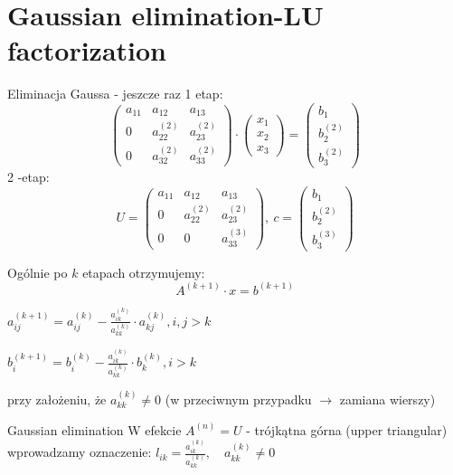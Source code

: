 \section{Gaussian elimination-LU factorization}

\begin{frame}{Eliminacja Gaussa - jeszcze raz}
1 etap:
$$
\left(\begin{array}{lll}
a_{11} & a_{12} & a_{13}\\
0 & a_{22}^{(2)} &a_{23}^{(2)}\\
0 & a_{32}^{(2)} & a_{33}^{(2)}
\end{array}\right) \cdot
 \left(\begin{array}{l}
x_{1}\\
x_{2}\\
x_{3}
\end{array}\right)=
\left(\begin{array}{l}
b_{1} \\
b_{2}^{(2)} \\
b_{3}^{(2)}
\end{array}\right)
$$
2 -etap:
$$
U = \left(\begin{array}{lll}
a_{11} & a_{12} & a_{13}\\
0 & a_{22}^{(2)} &a_{23}^{(2)}\\
0 & 0 & a_{33}^{(3)}
\end{array}\right)
,\ c=\left(\begin{array}{l}
b_{1}\\
b_{2}^{(2)}\\
b_{3}^{(3)}
\end{array}\right)
$$
\end{frame}
\begin{frame}{}

Ogólnie po $k$ etapach otrzymujemy:
$$
A^{(k+1)}\cdot x=b^{(k+1)}
$$

$a_{ij}^{(k+1)}=a_{ij}^{(k)}-\displaystyle \frac{a_{ik}^{(k)}}{a_{kk}^{(k)}}\cdot a_{kj}^{(k)}, i, j>k$ 


$b_{i}^{(k+1)}=b_{i}^{(k)}-\displaystyle \frac{a_{ik}^{(k)}}{a_{kk}^{(k)}}\cdot b_{k}^{(k)}, i>k$ 

przy założeniu, że $a_{kk}^{(k)}\neq 0$ (w przeciwnym przypadku $\rightarrow$ zamiana wierszy)

\end{frame}
\begin{frame}{Gaussian elimination}
W efekcie $A^{(n)}=U$ - trójkątna górna (upper triangular) \\
wprowadzamy oznaczenie: $l_{ik}=\displaystyle \frac{a_{ik}^{(k)}}{a_{kk}^{(k)}}, \quad a_{kk}^{(k)}\neq 0 $
\end{frame}
